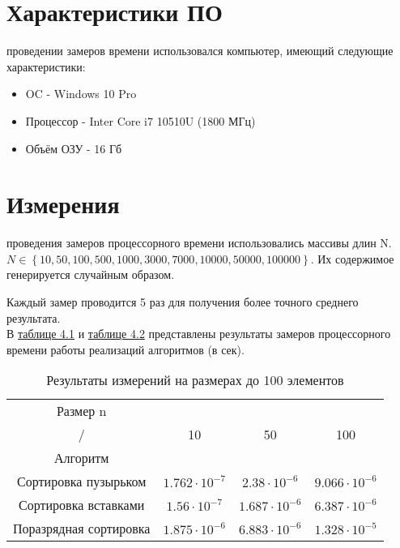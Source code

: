 \section{Характеристики ПО}
 проведении замеров времени использовался компьютер, имеющий следующие характеристики:
\begin{itemize}
	\item OC - Windows 10 Pro
	\item Процессор - Inter Core i7 10510U (1800 МГц)
	\item Объём ОЗУ - 16 Гб
\end{itemize}

\section{Измерения}
 проведения замеров процессорного времени использовались массивы длин N. \\
$N \in \left\lbrace 10, 50, 100, 500, 1000, 3000, 7000, 10000, 50000, 100000 \right\rbrace$.
Их содержимое генерируется случайным образом.

Каждый замер проводится 5 раз для получения более точного среднего результата.\\

В \hyperref[table_4_1]{таблице 4.1} и \hyperref[table_4_2]{таблице 4.2} представлены результаты замеров процессорного времени работы реализаций алгоритмов (в сек).

\begin{table}[ph] \label{table_4_1}
	\caption{Результаты измерений на размерах до 100 элементов}
	\centering
	\begin{tabular}{|c|c|c|c|}
		\hline
		Размер n&&&\\
		/    &10 &50 & 100 \\
		Алгоритм    &&&\\
		\hline
		Сортировка пузырьком & $1.762\cdot10^{-7}$ & $2.38\cdot10^{-6}$ & $9.066\cdot10^{-6}$ \\
		\hline
		Сортировка вставками & $1.56\cdot10^{-7}$ & $1.687\cdot10^{-6}$ & $6.387\cdot10^{-6}$ \\
		\hline
		Поразрядная сортировка & $1.875\cdot10^{-6}$ & $6.883\cdot10^{-6}$ & $1.328\cdot10^{-5}$ \\
		\hline
	\end{tabular}
\end{table}


